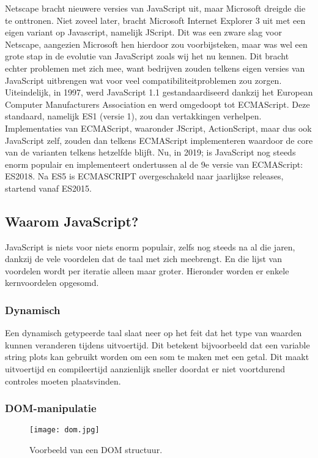 Netscape bracht nieuwere versies van JavaScript uit, maar Microsoft dreigde die te onttronen. Niet zoveel later, bracht Microsoft Internet Explorer 3 uit met een eigen variant op Javascript, namelijk JScript. Dit was een zware slag voor Netscape, aangezien Microsoft hen hierdoor zou voorbijsteken, maar was wel een grote stap in de evolutie van JavaScript zoals wij het nu kennen. Dit bracht echter problemen met zich mee, want bedrijven zouden telkens eigen versies van JavaScript uitbrengen wat voor veel compatibiliteitproblemen zou zorgen. Uiteindelijk, in 1997, werd JavaScript 1.1 gestandaardiseerd dankzij het European Computer Manufacturers Association en werd omgedoopt tot ECMAScript. \autocite{Wiley2016} Deze standaard, namelijk ES1 (versie 1), zou dan vertakkingen verhelpen. Implementaties van ECMAScript, waaronder JScript, ActionScript, maar dus ook JavaScript zelf, zouden dan telkens ECMAScript implementeren waardoor de core van de varianten telkens hetzelfde blijft. Nu, in 2019; is JavaScript nog steeds enorm populair en implementeert ondertussen al de 9e versie van ECMAScript: ES2018. Na ES5 is ECMASCRIPT overgeschakeld naar jaarlijkse releases, startend vanaf ES2015.

\subsection{Waarom JavaScript?}
\label{sec:jsWhy}

JavaScript is niets voor niets enorm populair, zelfs nog steeds na al die jaren, dankzij de vele voordelen dat de taal met zich meebrengt. En die lijst van voordelen wordt per iteratie alleen maar groter. Hieronder worden er enkele kernvoordelen opgesomd.

\subsubsection{Dynamisch}
\label{sec:dynamic}

Een dynamisch getypeerde taal slaat neer op het feit dat het type van waarden kunnen veranderen tijdens uitvoertijd. Dit betekent bijvoorbeeld dat een variable string plots kan gebruikt worden om een som te maken met een getal. Dit maakt uitvoertijd en compileertijd aanzienlijk sneller doordat er niet voortdurend controles moeten plaatsvinden. 

\subsubsection{DOM-manipulatie}
\label{sec:DOM}
\begin{figure}
	\texttt{[image: dom.jpg]}
	\caption{Voorbeeld van een DOM structuur.}
	\label{fig:dom}
\end{figure}

